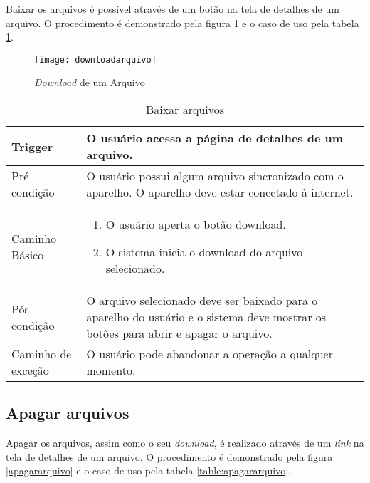 Baixar os arquivos é possível através de um botão na tela de detalhes de um arquivo. O procedimento é demonstrado pela figura \ref{downloadarquivo} e o caso de uso pela tabela \ref{table:downloadarquivo}.

\begin{figure}[H]
    \centering
\texttt{[image: downloadarquivo]}
    \caption{\textit{Download} de um Arquivo}
    \label{downloadarquivo}
\end{figure}

\begin{table}[H]
  \begin{tabular}{ p{} | p{} }
    Trigger & O usuário acessa a página de detalhes de um arquivo.\\
    \hline
    Pré condição & O usuário possui algum arquivo sincronizado com o aparelho. O aparelho deve estar conectado à internet.\\
    \hline
    Caminho Básico &
    \begin{minipage}{5in}
      \vskip 4pt
      \begin{enumerate}
        \item O usuário aperta o botão download.
        \item O sistema inicia o download do arquivo selecionado.
      \end{enumerate}
      \vskip 4pt
    \end{minipage} \\
    \hline
    Pós condição & O arquivo selecionado deve ser baixado para o aparelho do usuário e o sistema deve mostrar os botões para abrir e apagar o arquivo.\\
    \hline
    Caminho de exceção & O usuário pode abandonar a operação a qualquer momento.\\
    \hline
  \end{tabular}
  \caption{Baixar arquivos}
  \label{table:downloadarquivo}
\end{table}

\subsection{Apagar arquivos}

Apagar os arquivos, assim como o seu \textit{download}, é realizado através de um \textit{link} na tela de detalhes de um arquivo. O procedimento é demonstrado pela figura \ref{apagararquivo} e o caso de uso pela tabela \ref{table:apagararquivo}.


